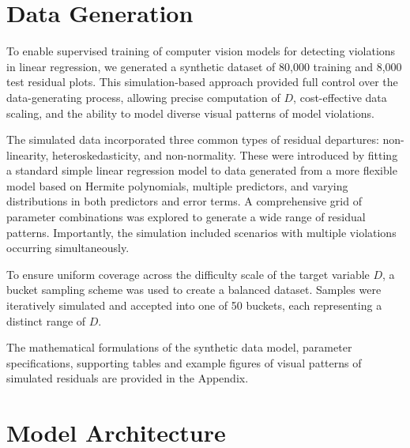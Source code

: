 \documentclass[]{interact}
\theoremstyle{plain}%
\theoremstyle{definition}
\theoremstyle{remark}
\begin{document}
\section{Data Generation}\label{sec-model-data-generation}

To enable supervised training of computer vision models for detecting
violations in linear regression, we generated a synthetic dataset of
80,000 training and 8,000 test residual plots. This simulation-based
approach provided full control over the data-generating process,
allowing precise computation of \(D\), cost-effective data scaling, and
the ability to model diverse visual patterns of model violations.

The simulated data incorporated three common types of residual
departures: non-linearity, heteroskedasticity, and non-normality. These
were introduced by fitting a standard simple linear regression model to
data generated from a more flexible model based on Hermite polynomials,
multiple predictors, and varying distributions in both predictors and
error terms. A comprehensive grid of parameter combinations was explored
to generate a wide range of residual patterns. Importantly, the
simulation included scenarios with multiple violations occurring
simultaneously.

To ensure uniform coverage across the difficulty scale of the target
variable \(D\), a bucket sampling scheme was used to create a balanced
dataset. Samples were iteratively simulated and accepted into one of 50
buckets, each representing a distinct range of \(D\).

The mathematical formulations of the synthetic data model, parameter
specifications, supporting tables and example figures of visual patterns
of simulated residuals are provided in the Appendix.

\section{Model Architecture}\label{sec-model-architecture}
\end{document}
